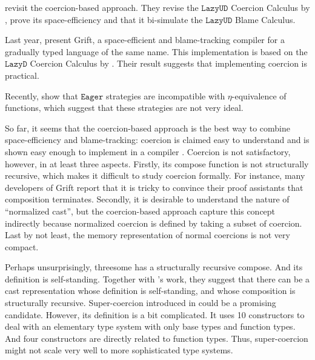 \documentclass[acmsmall,review,anonymous]{acmart}\settopmatter{printfolios=true,printccs=false,printacmref=false}
\newcommand{\lazyUD}{$\mathtt{Lazy UD}$}
\newcommand{\lazyD}{$\mathtt{Lazy D}$}
\newcommand{\eager}{$\mathtt{Eager}$}
\begin{document}
\citet{siek2015blame} revisit the coercion-based approach. They revise the 
\lazyUD{} Coercion Calculus by \citet{siek2012interpretations}, prove its 
space-efficiency and that it bi-simulate the \lazyUD{} Blame Calculus.

Last year, \citet{kuhlenschmidt2018efficient} present Grift, a space-efficient 
and blame-tracking compiler for a gradually typed language of the same name. 
This implementation is based on the \lazyD{} Coercion Calculus by 
\citet{siek2012interpretations}.
Their result suggests that implementing coercion is practical. 

Recently, \citet{new2019gradual} show that \eager{} strategies are 
incompatible with $\eta$-equivalence of functions, which suggest that these 
strategies are not very ideal. 

So far, it seems that the coercion-based approach is the best way to combine 
space-efficiency and blame-tracking: coercion is claimed easy to 
understand \cite{garcia2013calculating}\cite{siek2015blame} and is shown 
easy enough to implement in a compiler \cite{kuhlenschmidt2018efficient}.
Coercion is not satisfactory, however, in at least three aspects.
Firstly, its compose function is not structurally recursive, which makes 
it difficult to study coercion formally.
For instance, many developers of Grift report that it is tricky to convince 
their proof assistants that composition terminates. 
Secondly, it is desirable to understand the nature of ``normalized cast'', but 
the coercion-based approach capture this concept indirectly because normalized 
coercion is defined by taking a subset of coercion.
Last by not least, the memory representation of normal coercions is not very 
compact.

Perhaps unsurprisingly, threesome has a structurally recursive compose. And its 
definition is self-standing. Together with \citet{garcia2013calculating}'s 
work, they suggest that there can be a cast representation whose definition is 
self-standing, and whose composition is structurally recursive. 
Super-coercion introduced in \citet{garcia2013calculating} could be a promising 
candidate. However, its definition is a bit complicated. It uses 10 
constructors to deal with an elementary type system with only base types and 
function types. And four constructors are directly related to function types. 
Thus, super-coercion might not scale very well to more sophisticated type 
systems.
\end{document}
